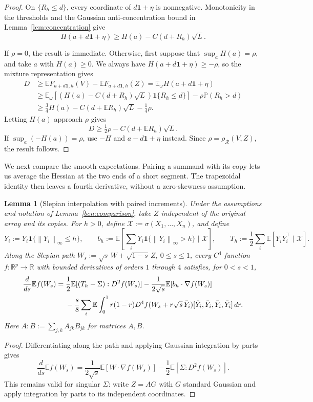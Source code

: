 \documentclass[11pt,letterpaper]{article}
\newenvironment{recovered}{}{}
\newtheorem{lemma}{Lemma}
\theoremstyle{remark}
\newcommand{\E}{\mathbb E}
\newcommand{\Pp}{\mathbb P}
\newcommand{\R}{\mathbb R}
\newcommand{\norm}[1]{\left\lVert#1\right\rVert}
\newcommand{\rh}{\rho_{\mathcal R}}
\newcommand{\ind}{\mathbf 1}
\begin{document}
\begin{recovered}
\begin{proof}
On \(\{R_h\le d\}\), every coordinate of
\(d\mathbf1+\eta\) is nonnegative. Monotonicity in the thresholds
and the Gaussian {anti-concentration} bound in Lemma~\ref{lem:concentration} give
\[
 H(a+d\mathbf1+\eta)
 \ge H(a)-C(d+R_h)\sqrt L.
\]
{
If \(\rho=0\), the result is immediate. Otherwise, first suppose that
\(\sup_aH(a)=\rho\), and take \(a\) with \(H(a)\ge0\).
We always have \(H(a+d\mathbf1+\eta)\ge-\rho\), so the mixture
representation gives
\begin{align*}
D&\ge \E F_{a+d\mathbf1,h}(V)-\E F_{a+d\mathbf1,h}(Z)
=\E_\omega H(a+d\mathbf1+\eta)\\
&\ge \E_\omega[(H(a)-C(d+R_h)\sqrt L)\ind\{R_h\le d\}]
-\rho\Pp(R_h>d)\\
&\ge\tfrac34H(a)-C(d+\E R_h)\sqrt L-\tfrac14\rho.
\end{align*}
Letting \(H(a)\) approach \(\rho\) gives
\[
 D\ge\tfrac12\rho-C(d+\E R_h)\sqrt L.
\]
If \(\sup_a(-H(a))=\rho\), use \(-H\) and
\(a-d\mathbf1+\eta\) instead. Since \(\rho=\rh(V,Z)\),
the result follows.

}
\end{proof}

We next compare the smooth expectations. Pairing a summand with its
copy lets us average the Hessian at the two ends of a short segment.
The trapezoidal identity then leaves a fourth derivative, without a
zero-skewness assumption.

\begin{lemma}[Slepian interpolation with paired increments]
\label{ben:paired-interpolation}
Under the assumptions and notation of Lemma~\ref{ben:comparison},
take \(Z\) independent of the original array and its copies. For
\(h>0\), {define} \(\mathcal X:=\sigma(X_1,\ldots,X_n)\), and define
\[
 \bar Y_i:=Y_i\ind\{\norm{Y_i}_\infty\le h\},\qquad
 b_h:=\E\left[\sum_iY_i\ind\{\norm{Y_i}_\infty>h\}
                    \mid\mathcal X\right],\qquad
 T_h:=\frac12\sum_i\E[\bar Y_i\bar Y_i^\top\mid\mathcal X].
\]
Along the Slepian path
\(W_s:=\sqrt s\,W+\sqrt{1-s}\,Z\), \(0\le s\le1\),
every \(C^4\) function \(f:\R^p\to\R\) with bounded derivatives
of orders \(1\) through \(4\) satisfies, for \(0<s<1\),
\begin{align}
 \frac d{ds}\E f(W_s)
 ={}&\frac12\E[(T_h-\Sigma):D^2f(W_s)]
       -\frac1{2\sqrt s}\E[b_h\cdot\nabla f(W_s)]\notag\\
 &-\frac{s}{8}\sum_i\E\int_0^1 r(1-r)
 D^4f(W_s+r\sqrt s\,\bar Y_i)
          [\bar Y_i,\bar Y_i,\bar Y_i,\bar Y_i]\,dr.
 \label{ben:slepian-identity}
\end{align}
Here \(A:B:=\sum_{j,k}A_{jk}B_{jk}\) for matrices \(A,B\).
\end{lemma}
\begin{proof}
Differentiating along the path and applying Gaussian integration by
parts gives
\begin{equation}\label{ben:slepian-initial}
 \frac d{ds}\E f(W_s)
 =\frac1{2\sqrt s}\E[W\cdot\nabla f(W_s)]
       -\frac12\E[\Sigma:D^2f(W_s)].
\end{equation}
This remains valid for singular \(\Sigma\): write \(Z=AG\) with
\(G\) standard Gaussian and apply integration by parts to its
independent coordinates.


\end{proof}
\end{recovered}
\end{document}
